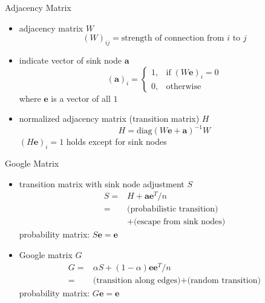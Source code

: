 \documentclass[fleqn,aspectratio=1610]{beamer}
\begin{document}
\begin{frame}[label={sec:orgb85c226}]{Adjacency Matrix}
\begin{itemize}
\item adjacency matrix \(W\)
\begin{equation}
  (W)_{ij} = \text{strength of connection from \(i\) to \(j\)}
\end{equation}
\item indicate vector of sink node \(\boldsymbol{a}\)
\begin{equation}
  (\boldsymbol{a})_i =
  \begin{cases}
    1, & \text{if}\;(W\boldsymbol{e})_i = 0\\
    0, & \text{otherwise}
  \end{cases}
\end{equation}
where \(\boldsymbol{e}\) is a vector of all \(1\)
\item normalized adjacency matrix (transition matrix) \(H\) 
\begin{equation}
  H = \mathrm{diag}(W\boldsymbol{e}+\boldsymbol{a})^{-1} W
\end{equation}
\((H\boldsymbol{e})_i=1\) holds except for sink nodes
\end{itemize}
\end{frame}

\begin{frame}[label={sec:org0ff587a}]{Google Matrix}
\begin{itemize}
\item transition matrix with sink node adjustment \(S\)
\begin{align}
  S =& H + \boldsymbol{a}\boldsymbol{e}^T/n\\
  =&\text{(probabilistic transition)}\\
     &+\text{(escape from sink nodes)}
\end{align}
probability matrix: \(S\boldsymbol{e}=\boldsymbol{e}\)
\item Google matrix \(G\)
\begin{align}
  G
  =& \alpha S + (1-\alpha) \boldsymbol{e}\boldsymbol{e}^T/n\\
  =&\text{(transition along edges)}
     +\text{(random transition)}
\end{align}
probability matrix: \(G\boldsymbol{e}=\boldsymbol{e}\)
\end{itemize}
\end{frame}
\end{document}
